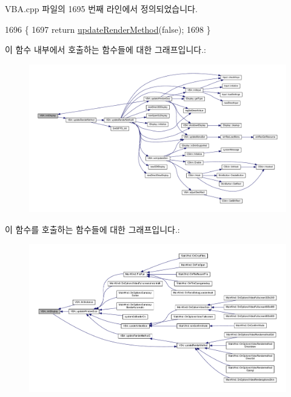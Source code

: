 V\+B\+A.\+cpp 파일의 1695 번째 라인에서 정의되었습니다.


\begin{DoxyCode}
1696 \{
1697   \textcolor{keywordflow}{return} \mbox{\hyperlink{class_v_b_a_a1d5b9c4597d5c565ce4d8ba1e594a89f}{updateRenderMethod}}(\textcolor{keyword}{false});
1698 \}
\end{DoxyCode}
이 함수 내부에서 호출하는 함수들에 대한 그래프입니다.\+:
\nopagebreak
\begin{figure}[H]
\begin{center}
\leavevmode
\includegraphics[width=350pt]{class_v_b_a_a641fd39cdf7ab5f8eff2f85f3ecf3260_cgraph}
\end{center}
\end{figure}
이 함수를 호출하는 함수들에 대한 그래프입니다.\+:
\nopagebreak
\begin{figure}[H]
\begin{center}
\leavevmode
\includegraphics[width=350pt]{class_v_b_a_a641fd39cdf7ab5f8eff2f85f3ecf3260_icgraph}
\end{center}
\end{figure}
\mbox{\label{class_v_b_a_ac19c75e259950ddd9bb5e97d73203ebb}} 
